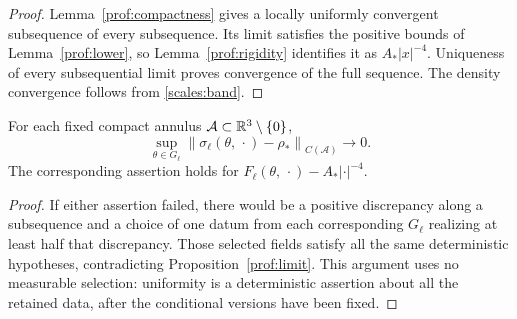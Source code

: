 \begin{proof}
Lemma~\ref{prof:compactness} gives a locally uniformly convergent
subsequence of every subsequence.  Its limit satisfies the positive
bounds of Lemma~\ref{prof:lower}, so Lemma~\ref{prof:rigidity}
identifies it as $A_*|x|^{-4}$.  Uniqueness of every subsequential
limit proves convergence of the full sequence.  The density
convergence follows from \eqref{scales:band}.
\end{proof}

\begin{corollary}
\label{prof:uniform}
For each fixed compact annulus $\mathcal A\subset\mathbb R^3\setminus\{0\}$,
\[
 \sup_{\theta\in G_\ell}
 \left\|\sigma_\ell(\theta,\,\cdot)-\rho_*\right\|_{C(\mathcal A)}
 \longrightarrow0.
\]
The corresponding assertion holds for
$F_\ell(\theta,\,\cdot)-A_*|\cdot|^{-4}$.
\end{corollary}

\begin{proof}
If either assertion failed, there would be a positive discrepancy
along a subsequence and a choice of one datum from each corresponding
$G_\ell$ realizing at least half that discrepancy.  Those selected
fields satisfy all the same deterministic hypotheses, contradicting
Proposition~\ref{prof:limit}.  This argument uses no measurable
selection: uniformity is a deterministic assertion about all the
retained data, after the conditional versions have been fixed.
\end{proof}
